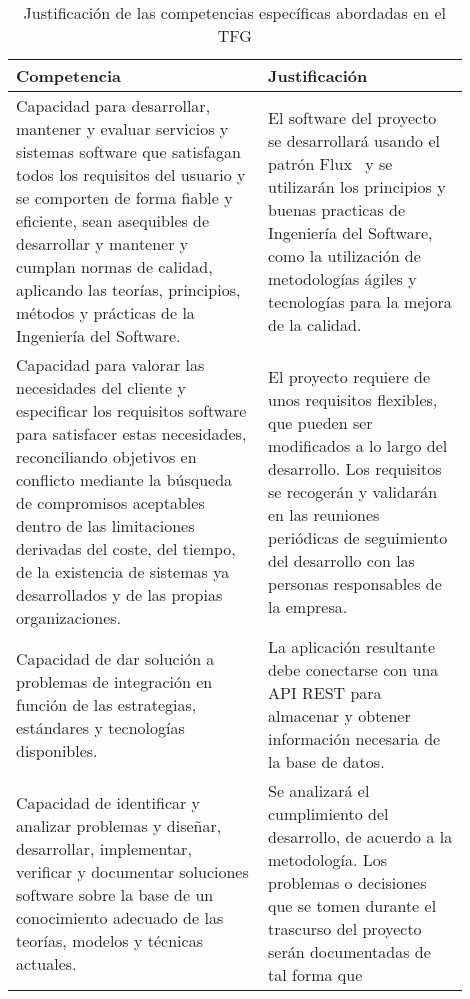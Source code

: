 \documentclass{pre-tfg}
\begin{document}
    \begin{table}[hp]
        \centering
        \caption{Justificación de las competencias específicas abordadas en el TFG}
        \label{tab:competencias}

        \begin{tabular}{p{0.5\linewidth}p{0.4\linewidth}}
            \textbf{Competencia} & \textbf{Justificación} \\
            \hline
            Capacidad para desarrollar, mantener y evaluar servicios y sistemas software que satisfagan
            todos los requisitos del usuario y se comporten de forma fiable y eficiente, sean asequibles
            de desarrollar y mantener y cumplan normas de calidad, aplicando las teorías, principios,
            métodos y prácticas de la Ingeniería del Software.
            & El software del proyecto se desarrollará usando el patrón Flux~\cite{FLUX} y se utilizarán los principios
            y buenas practicas de Ingeniería del Software, como la utilización de metodologías ágiles y
            tecnologías para la mejora de la calidad.\\
            Capacidad para valorar las necesidades del cliente y especificar los requisitos software para
            satisfacer estas necesidades, reconciliando objetivos en conflicto mediante la búsqueda de
            compromisos aceptables dentro de las limitaciones derivadas del coste, del tiempo, de la existencia
            de sistemas ya desarrollados y de las propias organizaciones.
            & El proyecto requiere de unos requisitos flexibles, que pueden ser modificados a lo largo del
            desarrollo. Los requisitos se recogerán y validarán en las reuniones periódicas de seguimiento
            del desarrollo con las personas responsables de la empresa.\\
            Capacidad de dar solución a problemas de integración en función de las estrategias, estándares
            y tecnologías disponibles.
            & La aplicación resultante debe conectarse con una API REST para almacenar y obtener información
            necesaria de la base de datos.\\
            Capacidad de identificar y analizar problemas y diseñar, desarrollar, implementar, verificar y
            documentar soluciones software sobre la base de un conocimiento adecuado de las teorías, modelos
            y técnicas actuales.
            & Se analizará el cumplimiento del desarrollo, de acuerdo a la metodología. Los problemas o
            decisiones que se tomen durante el trascurso del proyecto serán documentadas de tal forma que

\end{tabular}
\end{table}
\end{document}
